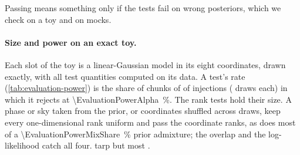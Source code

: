 Passing means something only if the tests fail on wrong posteriors, which we check on a toy and on mocks.

\paragraph{Size and power on an exact toy.}
\label{app:evaluation-power}
Each slot of the toy is a linear-Gaussian model in its eight coordinates, drawn exactly, with all test quantities
computed on its data. A test's rate (\cref{tab:evaluation-power}) is the share of chunks of \EvaluationPowerChunk{} of
\EvaluationPowerInjections{} injections (\EvaluationPowerDraws{} draws each) in which it rejects at
\qty{\EvaluationPowerAlpha}{\percent}. The rank tests hold their size. A phase or sky taken from the prior, or
coordinates shuffled across draws, keep every one-dimensional rank uniform and pass the coordinate ranks, as does most of a
\qty{\EvaluationPowerMixShare}{\percent} prior admixture; the overlap and the log-likelihood catch all four.
\Ac{tarp} \EvaluationPowerTarpWidth{} but
 most \EvaluationPowerTarpBlind{}.

